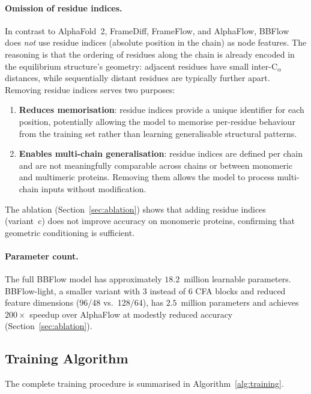 \documentclass[12pt,a4paper]{article}
\begin{document}
\paragraph{Omission of residue indices.}
In contrast to AlphaFold~2, FrameDiff, FrameFlow, and AlphaFlow, BBFlow does \emph{not} use
residue indices (absolute position in the chain) as node features.  The reasoning is that
the ordering of residues along the chain is already encoded in the equilibrium structure's
geometry: adjacent residues have small inter-$\mathrm{C}_\alpha$ distances, while sequentially
distant residues are typically further apart.  Removing residue indices serves two purposes:
\begin{enumerate}
  \item \textbf{Reduces memorisation}: residue indices provide a unique identifier for each
    position, potentially allowing the model to memorise per-residue behaviour from the
    training set rather than learning generalisable structural patterns.
  \item \textbf{Enables multi-chain generalisation}: residue indices are defined per chain
    and are not meaningfully comparable across chains or between monomeric and multimeric
    proteins.  Removing them allows the model to process multi-chain inputs without
    modification.
\end{enumerate}
The ablation (Section~\ref{sec:ablation}) shows that adding residue indices (variant~c) does
not improve accuracy on monomeric proteins, confirming that geometric conditioning is sufficient.

\paragraph{Parameter count.}
The full BBFlow model has approximately $18.2$~million learnable parameters.  BBFlow-light,
a smaller variant with 3 instead of 6 CFA blocks and reduced feature dimensions (96/48 vs.\
128/64), has $2.5$~million parameters and achieves $200\times$ speedup over AlphaFlow at
modestly reduced accuracy (Section~\ref{sec:ablation}).

\subsection{Training Algorithm}
\label{sec:training_alg}

The complete training procedure is summarised in Algorithm~\ref{alg:training}.
\end{document}
